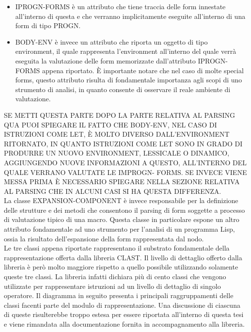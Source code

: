 \begin{itemize}

\item IPROGN-FORMS è un attributo che tiene traccia delle form innestate
all’interno di questa e che verranno implicitamente eseguite all’interno di
una form di tipo PROGN.

\item BODY-ENV è invece un attributo che riporta un oggetto di tipo
environment, il quale rappresenta l’environment all’interno del quale verrà
eseguita la valutazione delle form memorizzate dall’attributo IPROGN-FORMS
appena riportato. È importante notare che nel caso di molte special forms,
questo attributo risulta di fondamentale importanza agli scopi di uno
strumento di analisi, in quanto consente di osservare il reale ambiente di
valutazione.

\end{itemize}

SE METTI QUESTA PARTE DOPO LA PARTE RELATIVA AL PARSING QUA PUOI SPIEGARE IL
FATTO CHE BODY-ENV, NEL CASO DI ISTRUZIONI COME LET, È MOLTO DIVERSO
DALL’ENVIRONMENT RITORNATO, IN QUANTO ISTRUZIONI COME LET SONO IN GRADO DI
PRODURRE UN NUOVO ENVIRONMENT, LESSICALE O DINAMICO, AGGIUNGENDO NUOVE
INFORMAZIONI A QUESTO, ALL’INTERNO DEL QUALE VERRANO VALUTATE LE IMPROGN-
FORMS. SE INVECE VIENE MESSA PRIMA È NECESSARIO SPIEGARE NELLA SEZIONE
RELATIVA AL PARSING CHE IN ALCUNI CASI SI HA QUESTA DIFFERENZA.\\

La classe EXPANSION-COMPONENT è invece responsabile per la definizione delle
strutture e dei metodi che consentono il parsing di form soggette a processo
di valutazione tipico di una macro. Questa classe in particolare espone un
altro attributo fondamentale ad uno strumento per l’analisi di un programma
Lisp, ossia la risultato dell’espansione della form rappresentata dal nodo.\\

Le tre classi appena riportate rappresentano il substrato fondamentale della
rappresentazione offerta dalla libreria CLAST. Il livello di dettaglio offerto
dalla libreria è però molto maggiore rispetto a quello possibile utilizzando
solamente queste tre classi. La libreria infatti dichiara più di cento classi
che vengono utilizzate per rappresentare istruzioni ad un livello di dettaglio
di singolo operatore. Il diagramma in seguito presenta i principali
raggruppamenti delle classi facenti parte del modulo di rappresentazione. Una
discussione di ciascuna di queste risulterebbe troppo estesa per essere
riportata all’interno di questa tesi e viene rimandata alla documentazione
fornita in accompagnamento alla libreria.\\

